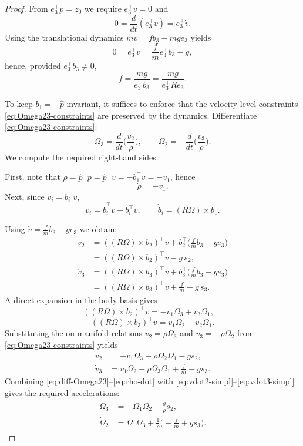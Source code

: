 \documentclass[letterpaper, 10 pt, conference]{ieeeconf}
\begin{document}
\begin{proof}
From $e_3^\top p=z_0$ we require $e_3^\top v=0$ and
\[
0=\frac{d}{dt}(e_3^\top v)=e_3^\top \dot v.
\]
Using the translational dynamics $m\dot v=f b_3-mg e_3$ yields
\[
0=e_3^\top\dot v=\frac{f}{m}e_3^\top b_3-g,
\]
hence, provided $e_3^\top b_3\neq 0$,
\begin{equation}\label{eq:f-law}
{\quad f=\frac{mg}{e_3^\top b_3}=\frac{mg}{e_3^\top R e_3}.\quad}
\end{equation}

To keep $b_1=-\hat{p}$ invariant, it suffices to enforce that the velocity-level constraints \eqref{eq:Omega23-constraints} are preserved by the dynamics. Differentiate \eqref{eq:Omega23-constraints}:
\begin{equation}\label{eq:diff-Omega23}
\dot\Omega_3 = \frac{d}{dt}\Big(\frac{v_2}{\rho}\Big),\qquad
\dot\Omega_2 = -\frac{d}{dt}\Big(\frac{v_3}{\rho}\Big).
\end{equation}
We compute the required right-hand sides.

First, note that $\dot\rho = \hat{p}^\top \dot p = \hat{p}^\top v = -b_1^\top v = -v_1$, hence
\begin{equation}\label{eq:rho-dot}
\dot\rho = -v_1.
\end{equation}
Next, since $v_i=b_i^\top v$,
\[
\dot v_i = \dot b_i^\top v + b_i^\top \dot v,\qquad \dot b_i=(R \Omega)\times b_1.
\]

Using $\dot v=\frac{f}{m}b_3-ge_3$ we obtain:
\begin{align*}
\dot v_2 &= ((R \Omega)\times b_2)^\top v + b_2^\top \Big(\frac{f}{m}b_3-ge_3\Big)\\
&= ((R \Omega)\times b_2)^\top v - g\, s_2,\\
\dot v_3 &= ((R \Omega)\times b_3)^\top v + b_3^\top \Big(\frac{f}{m}b_3-ge_3\Big)\\
&= ((R \Omega)\times b_3)^\top v + \frac{f}{m}- g\, s_3.
\end{align*}
A direct expansion in the body basis gives
\[
((R \Omega)\times b_2)^\top v =- v_1\Omega_3 + v_3\Omega_1,\quad\]
\[
((R \Omega)\times b_3)^\top v = v_1\Omega_2 - v_2\Omega_1.
\]
Substituting the on-manifold relations $v_2=\rho\Omega_3$ and $v_3=-\rho\Omega_2$ from \eqref{eq:Omega23-constraints} yields
\begin{align}
\dot v_2 &= -v_1\Omega_3 - \rho\Omega_2\Omega_1 - g s_2,\label{eq:vdot2-simpl}\\
\dot v_3 &= v_1\Omega_2 - \rho\Omega_3\Omega_1 + \frac{f}{m}- g s_3.\label{eq:vdot3-simpl}
\end{align}
Combining \eqref{eq:diff-Omega23}--\eqref{eq:rho-dot} with \eqref{eq:vdot2-simpl}--\eqref{eq:vdot3-simpl} gives the required accelerations:
\begin{equation}\label{eq:Omega23dot-required}
{\begin{aligned}
\dot\Omega_3 &= -\Omega_1\Omega_2 - \frac{g}{\rho}s_2,\\[1mm]
\dot\Omega_2 &= \Omega_1\Omega_3 + \frac{1}{\rho}\Big(-\frac{f}{m}+g s_3\Big).
\end{aligned}}
\end{equation}


\end{proof}
\end{document}
